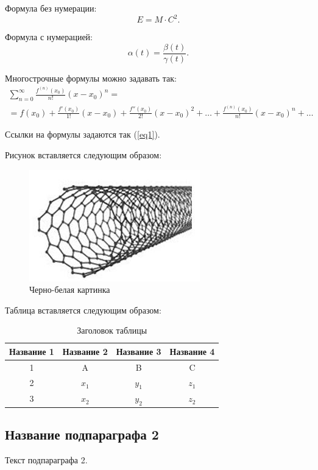 \documentclass{nsart_eng}
\begin{document}
Формула без нумерации:
$$
E=M \cdot C^2.
$$

Формула с нумерацией:
\begin{equation} \label{eq1}
\alpha (t) = \frac{ \beta (t)}{\gamma (t)}.
\end{equation}

Многострочные формулы можно задавать так:
\begin{multline} \label{eq2}
\sum\limits_{n=0}^\infty  {\frac{{f^{\left( n \right)} \left( {x_0 } \right)}}{{n!}}\left( {x - x_0 } \right)^n }  = \\
= f\left( {x_0 } \right) + \frac{{f'\left( {x_0 }
\right)}}{{1!}}\left( {x - x_0 } \right) +
 \frac{{f''\left( {x_0 } \right)}}{{2!}}\left( {x - x_0 } \right)^2 + \dots +
 \frac{{f^{\left( n \right)} \left( {x_0 } \right)}}{{n!}}\left( {x - x_0 } \right)^n  + \dots
\end{multline}

Ссылки на формулы задаются так  (\ref{eq1}).

Рисунок вставляется следующим образом:


\begin{figure}
\includegraphics{fig1.png}
\caption{Черно-белая картинка}
\end{figure}




Таблица вставляется следующим образом:
\begin{table}[htbp]
\caption{Заголовок таблицы}
\begin{tabular}
{|c||c|c|c|} \hline Название 1 & Название 2 & Название 3 & Название 4\\
\hline \hline 1 & A & B & C \\ \hline 2 & $x_1$ & $y_1$ & $z_1$ \\
\hline 3 & $x_2$ & $y_2$ & $z_2$ \\ \hline
\end{tabular}
\end{table}

\subsection{Название подпараграфа 2}
Текст подпараграфа 2.
\end{document}

